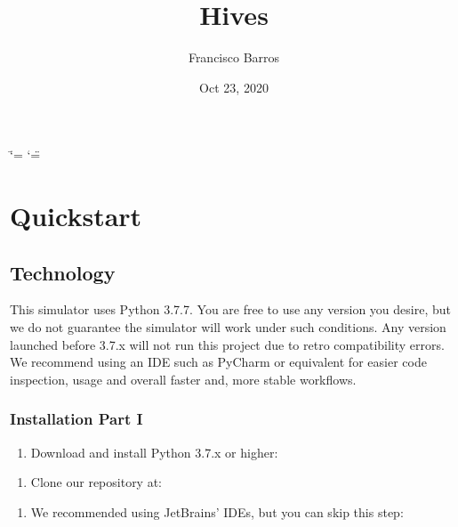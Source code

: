 \documentclass[letterpaper,10pt,english]{sphinxmanual}
\title{Hives}
\date{Oct 23, 2020}
\author{Francisco Barros}
\begin{document}
\ifdefined\shorthandoff
  \ifnum\catcode`\=\string=\active\shorthandoff{=}\fi
  \ifnum\catcode`\"=\active{}\fi
\fi

\pagestyle{empty}
\sphinxmaketitle
\pagestyle{plain}
\sphinxtableofcontents
\pagestyle{normal}
\label{\detokenize{index::doc}}



\chapter{Quickstart}
\label{\detokenize{quickstartdocs:quickstart}}\label{\detokenize{quickstartdocs::doc}}

\section{Technology}
\label{\detokenize{quickstartdocs:technology}}
This simulator uses Python 3.7.7. You are free to use any version you desire,
but we do not guarantee the simulator will work under such conditions.
Any version launched before 3.7.x will not run this project due to retro
compatibility errors. We recommend using an IDE such as PyCharm or equivalent
for easier code inspection, usage and overall faster and, more stable workflows.


\subsection{Installation \sphinxhyphen{} Part I}
\label{\detokenize{quickstartdocs:installation-part-i}}\begin{enumerate}
%
\item {} 
Download and install Python 3.7.x or higher:

\end{enumerate}

\begin{DUlineblock}{0em}
\item[] \sphinxhyphen{} 
\end{DUlineblock}
\begin{enumerate}
%
\setcounter{enumi}{1}
\item {} 
Clone our repository at:

\end{enumerate}

\begin{DUlineblock}{0em}
\item[] \sphinxhyphen{} 
\end{DUlineblock}
\begin{enumerate}
%
\setcounter{enumi}{2}
\item {} 
We recommended using JetBrains’ IDEs, but you can skip this step:

\end{enumerate}
\end{document}
